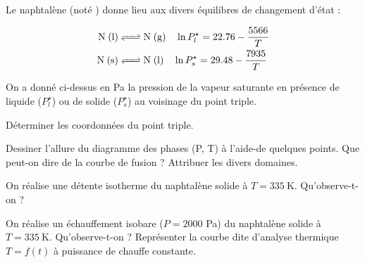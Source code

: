 \begin{exercise}
Le naphtalène (noté ) donne lieu aux divers équilibres de changement d'état :

\begin{align*}
\ce{N (l) &<=> N (g)} \quad \ln P_l^\star = 22.76 - \frac{5566}{T} \\
\ce{N (s) &<=> N (l)} \quad \ln P_s^\star = 29.48 - \frac{7935}{T}
\end{align*}

On a donné ci-dessus en \si{\pascal} la pression de la vapeur saturante en présence de liquide ($P_l^\star$) ou de solide ($P_s^\star$) au voisinage du point triple.

\begin{questions}
\question Déterminer les coordonnées du point triple.

\question Dessiner l'allure du diagramme des phases (P, T) à l'aide-de quelques points. Que peut-on dire de la courbe de fusion ? Attribuer les divers domaines.

\question On réalise une détente isotherme du naphtalène solide à $T = 335 ~ \si{\kelvin}$. Qu'observe-t-on ?

\question On réalise un échauffement isobare ($P = 2000$ \si{\pascal}) du naphtalène solide à $T=335 ~ \si{\kelvin}$. Qu'observe-t-on ? Représenter la courbe dite d'analyse thermique $T = f(t)$ à
puissance de chauffe constante.
\end{questions}

\end{exercise}